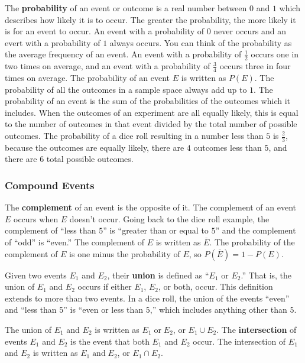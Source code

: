 \documentclass[twocolumn]{article}
\newcommand{\pand}{\mathop\text{and}}
\newcommand{\por}{\mathop\text{or}}
\begin{document}
The \textbf{probability} of an event or outcome is a real number between $0$
and $1$ which describes how likely it is to occur. The greater the
probability, the more likely it is for an event to occur. An event with a
probability of $0$ never occurs and an evert with a probability of $1$
always occurs. You can think of the probability as the average frequency of
an event. An event with a probability of $\frac{1}{2}$ occurs one in two
times on average, and an event with a probability of $\frac{3}{4}$ occurs
three in four times on average. The probability of an event $E$ is written
as $P(E)$. The probability of all the outcomes in a sample space always add
up to $1$. The probability of an event is the sum of the probabilities of
the outcomes which it includes. When the outcomes of an experiment are all
equally likely, this is equal to the number of outcomes in that event
divided by the total number of possible outcomes. The probability of a dice
roll resulting in a number less than $5$ is $\frac{2}{3}$, because the
outcomes are equally likely, there are $4$ outcomes less than $5$, and there
are $6$ total possible outcomes.

\subsubsection*{Compound Events}
The \textbf{complement} of an event is the opposite of it. The complement of
an event $E$ occurs when $E$ doesn't occur. Going back to the dice roll
example, the complement of ``less than $5$'' is ``greater than or equal to
$5$'' and the complement of ``odd'' is ``even.'' The complement of $E$ is
written as $\overline{E}$. The probability of the complement of $E$ is one
minus the probability of $E$, so $P(\overline{E}) = 1 - P(E)$.

Given two events $E_1$ and $E_2$, their \textbf{union} is defined as ``$E_1$
or $E_2$.'' That is, the union of $E_1$ and $E_2$ occurs if either $E_1$,
$E_2$, or both, occur. This definition extends to more than two events.  In
a dice roll, the union of the events ``even'' and ``less than $5$'' is
``even or less than $5$,'' which includes anything other than $5$.

The union of $E_1$ and $E_2$ is written as $E_1 \por E_2$, or $E_1 \cup E_2$.
The \textbf{intersection} of events $E_1$ and $E_2$ is the event that both $E_1$
and $E_2$ occur. The intersection of $E_1$ and $E_2$ is written as $E_1 \pand
E_2$, or $E_1 \cap E_2$.
\end{document}
